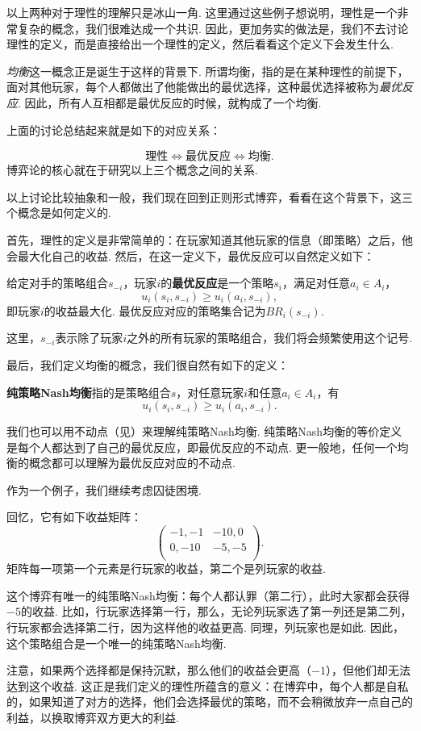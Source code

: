 以上两种对于理性的理解只是冰山一角. 这里通过这些例子想说明，理性是一个非常复杂的概念，我们很难达成一个共识. 因此，更加务实的做法是，我们不去讨论理性的定义，而是直接给出一个理性的定义，然后看看这个定义下会发生什么.

\emph{均衡}这一概念正是诞生于这样的背景下. 所谓均衡，指的是在某种理性的前提下，面对其他玩家，每个人都做出了他能做出的最优选择，这种最优选择被称为\emph{最优反应}. 因此，所有人互相都是最优反应的时候，就构成了一个均衡.

上面的讨论总结起来就是如下的对应关系：

\[
\text{理性}\iff\text{最优反应}\iff\text{均衡}.
\]
博弈论的核心就在于研究以上三个概念之间的关系.

以上讨论比较抽象和一般，我们现在回到正则形式博弈，看看在这个背景下，这三个概念是如何定义的.

首先，理性的定义是非常简单的：在玩家知道其他玩家的信息（即策略）之后，他会最大化自己的收益. 然后，在这一定义下，最优反应可以自然定义如下：

\begin{definition}[最优反应]
给定对手的策略组合$s_{-i}$，玩家$i$的\textbf{最优反应}是一个策略$s_i$，满足对任意$a_i\in A_i$，
    \[u_i(s_i,s_{-i})\geq u_i(a_i,s_{-i}),\]
即玩家$i$的收益最大化. 最优反应对应的策略集合记为$BR_i(s_{-i})$.
\end{definition}
这里，$s_{-i}$表示除了玩家$i$之外的所有玩家的策略组合，我们将会频繁使用这个记号.

最后，我们定义均衡的概念，我们很自然有如下的定义：

\begin{definition}[纯策略Nash均衡]
\textbf{纯策略Nash均衡}指的是策略组合$s$，对任意玩家$i$和任意$a_i\in A_i$，有
    \[u_i(s_i,s_{-i})\geq u_i(a_i,s_{-i}).\]
\end{definition}

我们也可以用不动点（见）来理解纯策略Nash均衡. 纯策略Nash均衡的等价定义是每个人都达到了自己的最优反应，即最优反应的不动点. 更一般地，任何一个均衡的概念都可以理解为最优反应对应的不动点.

作为一个例子，我们继续考虑囚徒困境.
\begin{example}[囚徒困境的纯策略Nash均衡]
回忆，它有如下收益矩阵：
\[
\begin{pmatrix}
-1,-1&-10,0\\
0,-10&-5,-5\\
\end{pmatrix}.
\]
矩阵每一项第一个元素是行玩家的收益，第二个是列玩家的收益. 

这个博弈有唯一的纯策略Nash均衡：每个人都认罪（第二行），此时大家都会获得$-5$的收益. 比如，行玩家选择第一行，那么，无论列玩家选了第一列还是第二列，行玩家都会选择第二行，因为这样他的收益更高. 同理，列玩家也是如此. 因此，这个策略组合是一个唯一的纯策略Nash均衡.

注意，如果两个选择都是保持沉默，那么他们的收益会更高（$-1$），但他们却无法达到这个收益. 这正是我们定义的理性所蕴含的意义：在博弈中，每个人都是自私的，如果知道了对方的选择，他们会选择最优的策略，而不会稍微放弃一点自己的利益，以换取博弈双方更大的利益.
\end{example}

